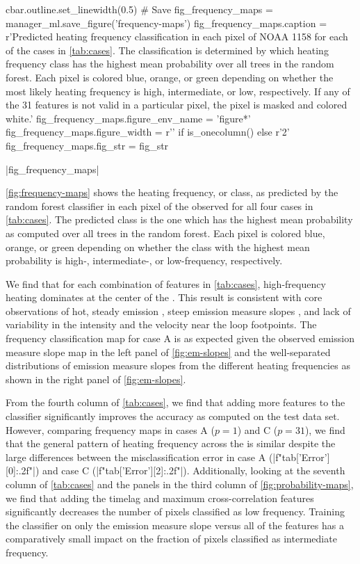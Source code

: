 \begin{pycode}[manager_ml]
cbar.outline.set_linewidth(0.5)
# Save
fig_frequency_maps = manager_ml.save_figure('frequency-maps')
fig_frequency_maps.caption = r'Predicted heating frequency classification in each pixel of NOAA 1158 for each of the cases in \autoref{tab:cases}. The classification is determined by which heating frequency class has the highest mean probability over all trees in the random forest. Each pixel is colored blue, orange, or green depending on whether the most likely heating frequency is high, intermediate, or low, respectively. If any of the 31 features is not valid in a particular pixel, the pixel is masked and colored white.'
fig_frequency_maps.figure_env_name = 'figure*'
fig_frequency_maps.figure_width = r'\columnwidth' if is_onecolumn() else r'2\columnwidth'
fig_frequency_maps.fig_str = fig_str
\end{pycode}
\py[manager_ml]|fig_frequency_maps|

\autoref{fig:frequency-maps} shows the heating frequency, or class, as predicted by the random forest classifier in each pixel of the observed \AR{} for all four cases in \autoref{tab:cases}. The predicted class is the one which has the highest mean probability as computed over all trees in the random forest. Each pixel is colored blue, orange, or green depending on whether the class with the highest mean probability is high-, intermediate-, or low-frequency, respectively.

We find that for each combination of features in \autoref{tab:cases}, high-frequency heating dominates at the center of the \AR{}. This result is consistent with \AR{} core observations of hot, steady emission \citep{warren_evidence_2010,warren_constraints_2011}, steep emission measure slopes \citep[e.g.][]{winebarger_using_2011,del_zanna_evolution_2015}, and lack of variability in the intensity \citep[e.g.][]{antiochos_constraints_2003} and the velocity \citep{brooks_flows_2009} near the loop footpoints. The frequency classification map for case A is as expected given the observed emission measure slope map in the left panel of \autoref{fig:em-slopes} and the well-separated distributions of emission measure slopes from the different heating frequencies as shown in the right panel of \autoref{fig:em-slopes}.

From the fourth column of \autoref{tab:cases}, we find that adding more features to the classifier significantly improves the accuracy as computed on the test data set. However, comparing frequency maps in cases A ($p=1$) and C ($p=31$), we find that the general pattern of heating frequency across the \AR{} is similar despite the large differences between the misclassification error in case A (\py[manager_ml]|f"{tab['Error'][0]:.2f}"|) and case C (\py[manager_ml]|f"{tab['Error'][2]:.2f}"|). Additionally, looking at the seventh column of \autoref{tab:cases} and the panels in the third column of \autoref{fig:probability-maps}, we find that adding the timelag and maximum cross-correlation features significantly decreases the number of pixels classified as low frequency. Training the classifier on only the emission measure slope versus all of the features has a comparatively small impact on the fraction of pixels classified as intermediate frequency.

